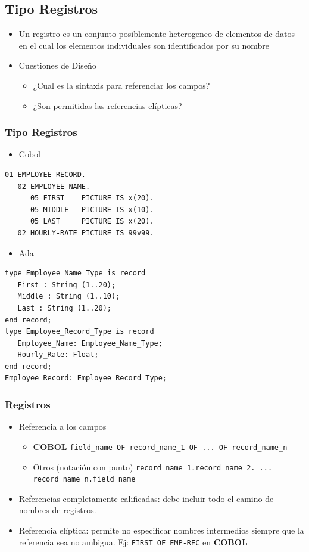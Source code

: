 \documentclass[11pt]{article}
\begin{document}
\subsection*{Tipo Registros}
\label{sec:orgheadline40}
\begin{itemize}
\item Un registro es un conjunto posiblemente heterogeneo de elementos de
datos en el cual los elementos individuales son identificados por su nombre
\item Cuestiones de Diseño
\begin{itemize}
\item ¿Cual es la sintaxis para referenciar los campos?
\item ¿Son permitidas las referencias elípticas?
\end{itemize}
\end{itemize}

\subsubsection*{Tipo Registros}
\label{sec:orgheadline32}
\begin{itemize}
\item Cobol
\end{itemize}
\begin{verbatim}
01 EMPLOYEE-RECORD.
   02 EMPLOYEE-NAME.
      05 FIRST    PICTURE IS x(20).
      05 MIDDLE   PICTURE IS x(10).
      05 LAST     PICTURE IS x(20).
   02 HOURLY-RATE PICTURE IS 99v99.
\end{verbatim}
\begin{itemize}
\item Ada
\end{itemize}
\begin{verbatim}
type Employee_Name_Type is record
   First : String (1..20);
   Middle : String (1..10);
   Last : String (1..20);
end record;
type Employee_Record_Type is record
   Employee_Name: Employee_Name_Type;
   Hourly_Rate: Float;
end record;
Employee_Record: Employee_Record_Type;
\end{verbatim}

\subsubsection*{Registros}
\label{sec:orgheadline33}
\begin{itemize}
\item Referencia a los campos
\begin{itemize}
\item \textbf{COBOL} \texttt{field\_name OF record\_name\_1 OF ... OF record\_name\_n}
\item Otros (notación con punto) \texttt{record\_name\_1.record\_name\_2. ... record\_name\_n.field\_name}
\end{itemize}
\item Referencias completamente calificadas: debe incluir todo el camino
de nombres de registros.
\item Referencia elíptica: permite no especificar nombres intermedios
siempre que la referencia sea no ambigua. Ej: \texttt{FIRST OF EMP-REC} en \textbf{COBOL}
\end{itemize}
\end{document}
